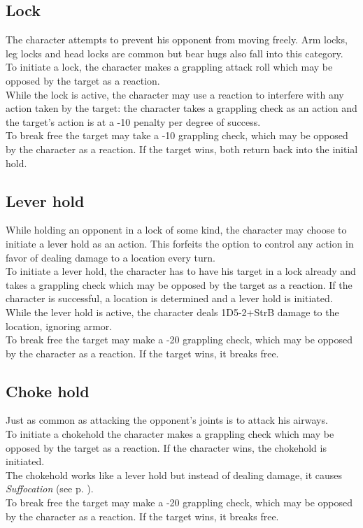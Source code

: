 \subsection*{Lock}
The character attempts to prevent his opponent from moving freely. Arm locks, leg locks and head locks are common but bear hugs also fall into this category.\\
To initiate a lock, the character makes a grappling attack roll which may be opposed by the target as a reaction.\\
While the lock is active,
	the character may use a reaction to interfere with any action taken by the target:
	the character takes a grappling check as an action
	and the target’s action is at a -10 penalty per degree of success.\\
To break free the target may take a -10 grappling check, which may be opposed by the character as a reaction. If the target wins, both return back into the initial hold.
\subsection*{Lever hold}
While holding an opponent in a lock of some kind, the character may choose to initiate a lever hold as an action. This forfeits the option to control any action in favor of dealing damage to a location every turn.\\
To initiate a lever hold, the character has to have his target in a lock already and takes a grappling check which may be opposed by the target as a reaction. If the character is successful, a location is determined and a lever hold is initiated.\\
While the lever hold is active, the character deals 1D5-2+StrB damage to the location, ignoring armor.\\
To break free the target may make a -20 grappling check, which may be opposed by the character as a reaction. If the target wins, it breaks free.
\subsection*{Choke hold}
Just as common as attacking the opponent's joints is to attack his airways.\\
To initiate a chokehold the character makes a grappling check which may be opposed by the target as a reaction. If the character wins, the chokehold is initiated.\\
The chokehold works like a lever hold but instead of dealing damage, it causes \emph{Suffocation} (see p. \pageref{hazards:suffocation}).\\
To break free the target may make a -20 grappling check, which may be opposed by the character as a reaction. If the target wins, it breaks free.
